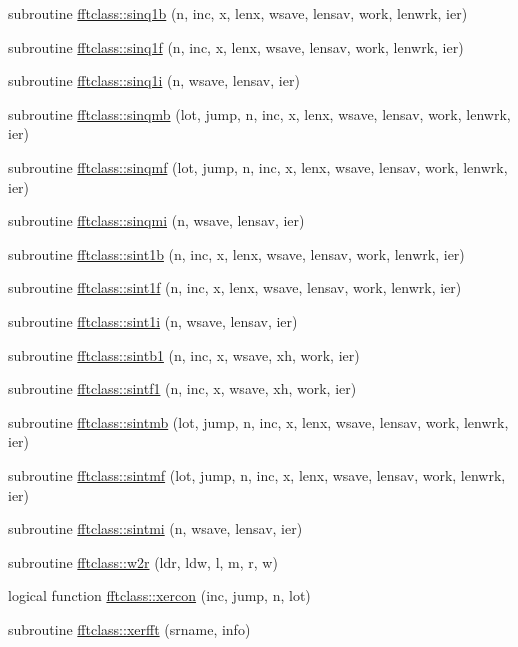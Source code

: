\begin{DoxyCompactItemize}
\item 
subroutine \mbox{\hyperlink{namespacefftclass_a6770a2a0c7bdf09af5ed719175fb4ca4}{fftclass\+::sinq1b}} (n, inc, x, lenx, wsave, lensav, work, lenwrk, ier)
\item 
subroutine \mbox{\hyperlink{namespacefftclass_a205d9dc43dfb082cdee420a4ae2fb269}{fftclass\+::sinq1f}} (n, inc, x, lenx, wsave, lensav, work, lenwrk, ier)
\item 
subroutine \mbox{\hyperlink{namespacefftclass_aa0d2ffdfc38a79ecd1b47de75f3d1084}{fftclass\+::sinq1i}} (n, wsave, lensav, ier)
\item 
subroutine \mbox{\hyperlink{namespacefftclass_aa7e7e40b824e045f452a09a2e7abf333}{fftclass\+::sinqmb}} (lot, jump, n, inc, x, lenx, wsave, lensav, work, lenwrk, ier)
\item 
subroutine \mbox{\hyperlink{namespacefftclass_ae56c7f24f27f2fb48f15359441b5e82f}{fftclass\+::sinqmf}} (lot, jump, n, inc, x, lenx, wsave, lensav, work, lenwrk, ier)
\item 
subroutine \mbox{\hyperlink{namespacefftclass_a642a9e3f241f3aaa6baf58741d4cdd3b}{fftclass\+::sinqmi}} (n, wsave, lensav, ier)
\item 
subroutine \mbox{\hyperlink{namespacefftclass_ada18e37204cdb55b83be98eaecc27730}{fftclass\+::sint1b}} (n, inc, x, lenx, wsave, lensav, work, lenwrk, ier)
\item 
subroutine \mbox{\hyperlink{namespacefftclass_a6ae22ff215b2e962b410eb1b9c4860d7}{fftclass\+::sint1f}} (n, inc, x, lenx, wsave, lensav, work, lenwrk, ier)
\item 
subroutine \mbox{\hyperlink{namespacefftclass_ae156ccdcf953af967a42d20df0ddb725}{fftclass\+::sint1i}} (n, wsave, lensav, ier)
\item 
subroutine \mbox{\hyperlink{namespacefftclass_af29f41f086c8e8901df2716d0b86db20}{fftclass\+::sintb1}} (n, inc, x, wsave, xh, work, ier)
\item 
subroutine \mbox{\hyperlink{namespacefftclass_aa79de4b10a068408990ac9ac8f32d134}{fftclass\+::sintf1}} (n, inc, x, wsave, xh, work, ier)
\item 
subroutine \mbox{\hyperlink{namespacefftclass_a4d9b6f96810b5b7a8b7dd38af74f5b55}{fftclass\+::sintmb}} (lot, jump, n, inc, x, lenx, wsave, lensav, work, lenwrk, ier)
\item 
subroutine \mbox{\hyperlink{namespacefftclass_a497c6a39bac7daa7973b53cb00ffd6c3}{fftclass\+::sintmf}} (lot, jump, n, inc, x, lenx, wsave, lensav, work, lenwrk, ier)
\item 
subroutine \mbox{\hyperlink{namespacefftclass_a9b28ecda04690fe2a4425da2b5625e4d}{fftclass\+::sintmi}} (n, wsave, lensav, ier)
\item 
subroutine \mbox{\hyperlink{namespacefftclass_af191171f5e31fbad6c0e224faaf6175e}{fftclass\+::w2r}} (ldr, ldw, l, m, r, w)
\item 
logical function \mbox{\hyperlink{namespacefftclass_a16b89da06cf17773f6b5aec6883952c2}{fftclass\+::xercon}} (inc, jump, n, lot)
\item 
subroutine \mbox{\hyperlink{namespacefftclass_a3e1884f0fa20142f45f2d3efe3246adc}{fftclass\+::xerfft}} (srname, info)
\end{DoxyCompactItemize}
